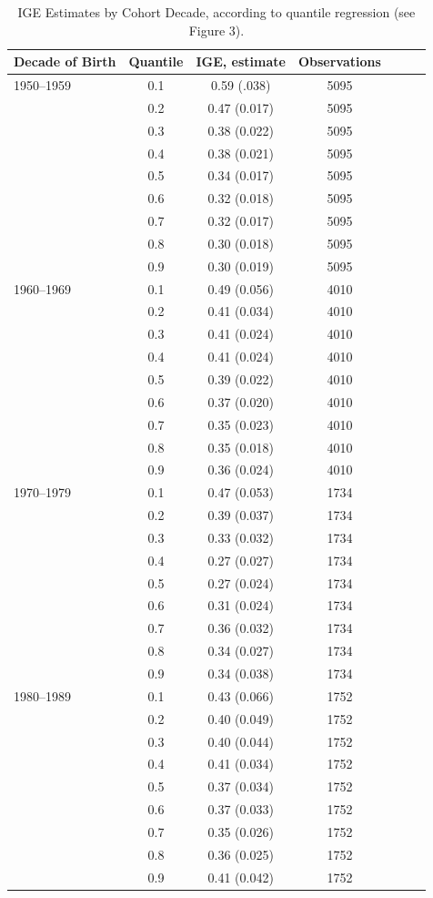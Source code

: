 \documentclass[notitlepage,12pt]{article}
\begin{document}
\begin{longtable}{lc|ccccc}
\caption{IGE Estimates by Cohort Decade, according to quantile regression (see Figure 3).} \\ \midrule
Decade of Birth & Quantile & IGE, estimate    & Observations  \\ \midrule
1950--1959 & 0.1 & 0.59 (.038)  & 5095   \\
& 0.2  & 0.47 (0.017) & 5095  \\
& 0.3      & 0.38   (0.022)  & 5095  \\
& 0.4   & 0.38 (0.021)  & 5095  \\
& 0.5    & 0.34 (0.017)  & 5095  \\
& 0.6   & 0.32 (0.018)  & 5095  \\
& 0.7    & 0.32 (0.017)  & 5095  \\
& 0.8    & 0.30 (0.018)  & 5095  \\
& 0.9   & 0.30 (0.019)  & 5095   \\ \hline
1960--1969 & 0.1  & 0.49 (0.056) & 4010 \\ 
& 0.2 & 0.41 (0.034) & 4010  \\
& 0.3 & 0.41 (0.024) & 4010  \\
& 0.4 & 0.41 (0.024) & 4010  \\
& 0.5 & 0.39 (0.022) & 4010  \\
& 0.6 & 0.37 (0.020) & 4010  \\
& 0.7 & 0.35 (0.023)   & 4010  \\
& 0.8 & 0.35 (0.018) & 4010  \\
& 0.9 & 0.36 (0.024) & 4010 \\ \hline
1970--1979 & 0.1& 0.47 (0.053) & 1734 &  \\ 
& 0.2&0.39 (0.037) & 1734 &  \\
& 0.3&0.33 (0.032) & 1734 &  \\
& 0.4&0.27 (0.027) & 1734 &  \\
& 0.5&0.27 (0.024) & 1734 &  \\
& 0.6&0.31 (0.024) & 1734 &  \\
& 0.7&0.36 (0.032) & 1734 &  \\
& 0.8&0.34 (0.027) & 1734 &  \\
& 0.9&0.34 (0.038) & 1734 & \\ \hline
1980--1989 & 0.1 & 0.43 (0.066)   & 1752  \\
& 0.2& 0.40  (0.049) & 1752  \\
& 0.3 &0.40 (0.044) & 1752  \\
& 0.4 &0.41 (0.034) & 1752  \\
& 0.5 &0.37 (0.034) & 1752  \\
& 0.6 &0.37  (0.033) & 1752  \\
& 0.7 &0.35 (0.026) & 1752  \\
& 0.8 &0.36  (0.025) & 1752  \\
& 0.9 &0.41  (0.042) & 1752 \\
\midrule \bottomrule
\end{longtable}
\end{document}

